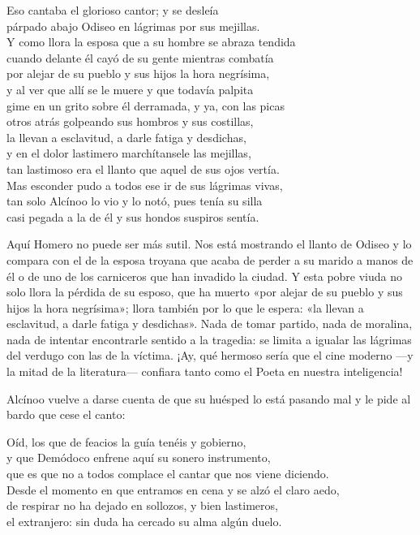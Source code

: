 \begin{versocita}
Eso cantaba el glorioso cantor; y se desleía\\
párpado abajo Odiseo en lágrimas por sus mejillas.\\
Y como llora la esposa que a su hombre se abraza tendida\\
cuando delante él cayó de su gente mientras combatía\\
por alejar de su pueblo y sus hijos la hora negrísima,\\
y al ver que allí se le muere y que todavía palpita\\
gime en un grito sobre él derramada, y ya, con las picas\\
otros atrás golpeando sus hombros y sus costillas,\\
la llevan a esclavitud, a darle fatiga y desdichas,\\
y en el dolor lastimero marchítansele las mejillas,\\
tan lastimoso era el llanto que aquel de sus ojos vertía.\\
Mas esconder pudo a todos ese ir de sus lágrimas vivas,\\
tan solo Alcínoo lo vio y lo notó, pues tenía su silla\\
casi pegada a la de él y sus hondos suspiros sentía.
\end{versocita}

Aquí Homero no puede ser más sutil. Nos está mostrando el llanto de Odiseo y lo compara con el de la esposa troyana que acaba de perder a su marido a manos de él o de uno de los carniceros que han invadido la ciudad. Y esta pobre viuda no solo llora la pérdida de su esposo, que ha muerto «por alejar de su pueblo y sus hijos la hora negrísima»; llora también por lo que le espera: «la llevan a esclavitud, a darle fatiga y desdichas». Nada de tomar partido, nada de moralina, nada de intentar encontrarle sentido a la tragedia: se limita a igualar las lágrimas del verdugo con las de la víctima. ¡Ay, qué hermoso sería que el cine moderno ---y la mitad de la literatura--- confiara tanto como el Poeta en nuestra inteligencia!


Alcínoo vuelve a darse cuenta de que su huésped lo está pasando mal y le pide al bardo que cese el canto:

\begin{versocita}
Oíd, los que de feacios la guía tenéis y gobierno,\\
y que Demódoco enfrene aquí su sonero instrumento,\\
que es que no a todos complace el cantar que nos viene diciendo.\\
Desde el momento en que entramos en cena y se alzó el claro aedo,\\
de respirar no ha dejado en sollozos, y bien lastimeros,\\
el extranjero: sin duda ha cercado su alma algún duelo.
\end{versocita}

